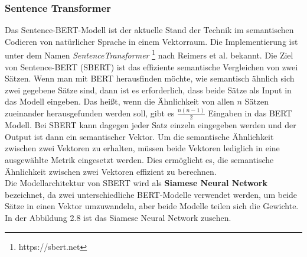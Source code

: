 \documentclass[12pt,letterpaper,ngerman]{article}
\begin{document}
\subsubsection{Sentence Transformer}
Das Sentence-BERT-Modell \cite{reimers-2019-sentence-bert}
ist der aktuelle Stand der Technik im semantischen Codieren 
von natürlicher Sprache in einem Vektorraum. Die Implementierung 
ist unter dem Namen \textit{SentenceTransformer} 
\footnote{https://sbert.net} nach Reimers et al. bekannt.
Die Ziel von Sentence-BERT (SBERT) ist das effiziente
semantische Vergleichen 
von zwei Sätzen. Wenn man mit BERT herausfinden möchte, wie semantisch
ähnlich sich zwei gegebene Sätze sind, dann ist es erforderlich, 
dass beide
Sätze als Input in das Modell eingeben. Das heißt, wenn die Ähnlichkeit 
von allen $n$ Sätzen zueinander herausgefunden werden soll,
gibt es $\frac{n(n-1)}{2}$ Eingaben in das BERT Modell.
Bei SBERT kann dagegen jeder Satz einzeln eingegeben werden und der
Output ist dann ein semantischer Vektor. Um die
semantische Ähnlichkeit zwischen zwei Vektoren zu erhalten,
müssen beide Vektoren lediglich in eine ausgewählte Metrik
eingesetzt werden. 
Dies ermöglicht es, die semantische Ähnlichkeit zwischen zwei Vektoren 
effizient zu berechnen.\\
Die Modellarchitektur von SBERT wird als {\bf Siamese Neural Network }
bezeichnet, da zwei unterschiedliche BERT-Modelle verwendet werden,
um beide Sätze in einen Vektor umzuwandeln, aber beide Modelle
teilen sich die Gewichte. In der Abbildung 2.8 ist das Siamese 
Neural Network zusehen.\\
\end{document}
